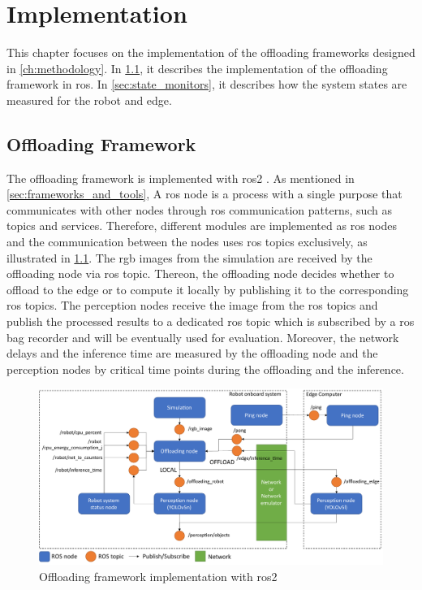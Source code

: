 \chapter{Implementation}\label{ch:implementation}

This chapter focuses on the implementation of the offloading frameworks designed in \cref{ch:methodology}. In \cref{sec:offloading_framework}, it describes the implementation of the offloading framework in \gls{ros}. In \cref{sec:state_monitors}, it describes how the system states are measured for the robot and edge. 

\section{Offloading Framework}\label{sec:offloading_framework}

The offloading framework is implemented with \gls{ros}2 \cite{Macenski2022}. As mentioned in \cref{sec:frameworks_and_tools}, A \gls{ros} node is a process with a single purpose that communicates with other nodes through \gls{ros} communication patterns, such as topics and services. Therefore, different modules are implemented as \gls{ros} nodes and the communication between the nodes uses \gls{ros} topics exclusively, as illustrated in \cref{fig:ros_implementation}. The \gls{rgb} images from the simulation are received by the offloading node via \gls{ros} topic. Thereon, the offloading node decides whether to offload to the edge or to compute it locally by publishing it to the corresponding \gls{ros} topics. The perception nodes receive the image from the \gls{ros} topics and publish the processed results to a dedicated \gls{ros} topic which is subscribed by a \gls{ros} bag recorder and will be eventually used for evaluation. Moreover, the network delays and the inference time are measured by the offloading node and the perception nodes by critical time points during the offloading and the inference. 

\begin{figure}
    \centering
    \includegraphics[width=\linewidth]{figures/setup/ros_implementation.pdf}
    \caption{Offloading framework implementation with \gls{ros}2}
    \label{fig:ros_implementation}
\end{figure}

